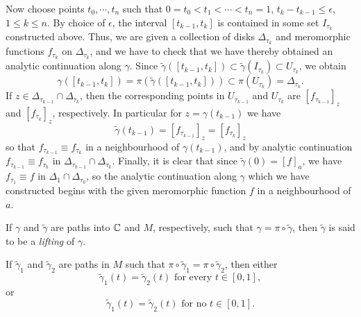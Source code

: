 \documentclass[a4paper,11pt]{article}
\begin{document}
\begin{myproof}
  Now choose points $t_0, \cdots, t_n$ such that $0 = t_0 < t_1 <
  \cdots < t_n = 1$, $t_k-t_{k-1} \le \epsilon$, $1\le k \le n$.  By
  choice of $\epsilon$, the interval $[t_{k-1},t_k]$ is contained in
  some set $I_{\tau_k}$ constructed above.  Thus, we are given a
  collection of disks $\Delta_{\tau_k}$ and meromorphic functions
  $f_{\tau_k}$ on $\Delta_{\tau_k}$, and we have to check that we have
  thereby obtained an analytic continuation along $\gamma$.  Since
  $\widetilde{\gamma}([t_{k-1}, t_k]) \subset
  \widetilde{\gamma}(I_{\tau_k}) \subset U_{\tau_k}$, we obtain
  $$
  \gamma([t_{k-1},t_k]) = \pi(\widetilde{\gamma}([t_{k-1},t_k]))
  \subset \pi(U_{\tau_k}) = \Delta_{\tau_k}.
  $$
  If $z \in \Delta_{\tau_{k-1}} \cap \Delta_{\tau_k}$, then the
  corresponding points in $U_{\tau_{k-1}}$ and $U_{\tau_{k}}$ are
  $[f_{\tau_{k-1}}]_z$ and $[f_{\tau_{k}}]_z$, respectively.  In
  particular for $z = \gamma(t_{k-1})$ we have
  $$
  \widetilde{\gamma}(t_{k-1}) = [f_{\tau_{k-1}}]_z 
  = [f_{\tau_{k}}]_z
  $$
  so that $f_{\tau_{k-1}} \equiv f_{\tau_{k}}$ in a neighbourhood of
  $\gamma(t_{k-1})$, and by analytic continuation $f_{\tau_{k-1}}
  \equiv f_{\tau_k}$ in $\Delta_{\tau_{k-1}} \cap \Delta_{\tau_k}$.
  Finally, it is clear that since $\widetilde{\gamma}(0) = [f]_a$, we
  have $f_{\tau_1} \equiv f$ in $\Delta_1 \cap \Delta_{\tau_0}$, so
  the analytic continuation along $\gamma$ which we have constructed
  begins with the given meromorphic function $f$ in a neighbourhood of
  $a$.
\end{myproof}

\begin{defn}
  \label{def:5}
  If $\gamma$ and $\widetilde{\gamma}$ are paths into ${\mathbb C}$ and $M$,
  respectively, such that $\gamma = \pi \circ \widetilde{\gamma}$,
  then $\widetilde{\gamma}$ is said to be a \emph{lifting} of
  $\gamma$. 
\end{defn}

\begin{propn}
  \label{propn:2}
  If $\widetilde{\gamma}_1$ and $\widetilde{\gamma}_2$ are paths in
  $M$ such that $\pi \circ \widetilde{\gamma}_1 = \pi \circ
  \widetilde{\gamma}_2$, then either
  $$
  \widetilde{\gamma}_1(t) = \widetilde{\gamma}_2(t)
  \text{ for every } t \in [0,1],
  $$
  or
  $$
  \widetilde{\gamma}_1(t) = \widetilde{\gamma}_2(t)
  \text{ for no } t \in [0,1].
  $$
\end{propn}
\end{document}
